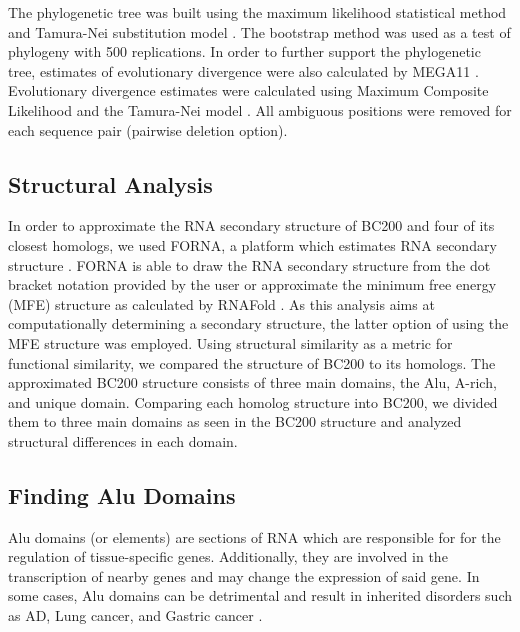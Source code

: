 \documentclass[conference, 11pt]{IEEEtran}
\begin{document}
The phylogenetic tree was built using the maximum likelihood statistical method and Tamura-Nei substitution model \cite{tamura1993estimation, tamura2004prospects}. 
The bootstrap method was used as a test of phylogeny with 500 replications.
In order to further support the phylogenetic tree, estimates of evolutionary divergence were also calculated by MEGA11 \cite{tamura2021mega11}. 
Evolutionary divergence estimates were calculated using Maximum Composite Likelihood and the Tamura-Nei model \cite{tamura1993estimation, tamura2004prospects}. 
All ambiguous positions were removed for each sequence pair (pairwise deletion option). 

\subsection{Structural Analysis}\label{sec:structure}

In order to approximate the RNA secondary structure of BC200 and four of its closest homologs, we used FORNA, a platform which estimates RNA secondary structure \cite{kerpedjiev2015forna}. 
FORNA is able to draw the RNA secondary structure from the dot bracket notation provided by the user or approximate the minimum free energy (MFE) structure as calculated by RNAFold \cite{lorenz2011viennarna}. 
As this analysis aims at computationally determining a secondary structure, the latter option of using the MFE structure was employed. 
Using structural similarity as a metric for functional similarity, we compared the structure of BC200 to its homologs.
The approximated BC200 structure consists of three main domains, the Alu, A-rich, and unique domain. 
Comparing each homolog structure into BC200, we divided them to three main domains as seen in the BC200 structure and analyzed structural differences in each domain.

\subsection{Finding Alu Domains}

Alu domains (or elements) are sections of RNA which are responsible for for the regulation of tissue-specific genes. 
Additionally, they are involved in the transcription of nearby genes and may change the expression of said gene. 
In some cases,  Alu domains can be detrimental and result in inherited disorders such as AD, Lung cancer, and Gastric cancer \cite{tseng2013oxidative}. 
\end{document}
